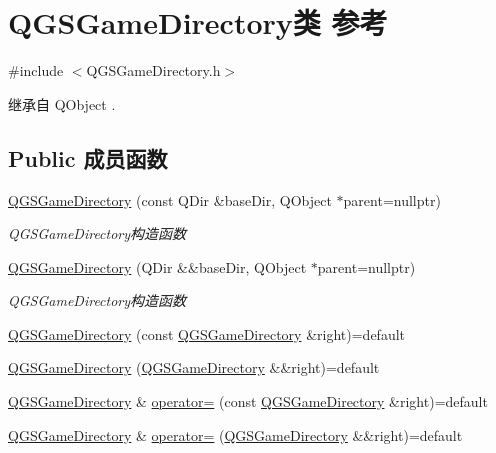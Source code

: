 \hypertarget{class_q_g_s_game_directory}{}\section{Q\+G\+S\+Game\+Directory类 参考}
\label{class_q_g_s_game_directory}


{\ttfamily \#include $<$Q\+G\+S\+Game\+Directory.\+h$>$}



继承自 Q\+Object .

\subsection*{Public 成员函数}
\begin{DoxyCompactItemize}
\item 
\mbox{\hyperlink{class_q_g_s_game_directory_a3bdb7ff5edb5e460f425cffb499fc25b}{Q\+G\+S\+Game\+Directory}} (const Q\+Dir \&base\+Dir, Q\+Object $\ast$parent=nullptr)
\begin{DoxyCompactList}\small\item\em Q\+G\+S\+Game\+Directory构造函数 \end{DoxyCompactList}\item 
\mbox{\hyperlink{class_q_g_s_game_directory_a1ce062aea1cbc90d891030e021df28dc}{Q\+G\+S\+Game\+Directory}} (Q\+Dir \&\&base\+Dir, Q\+Object $\ast$parent=nullptr)
\begin{DoxyCompactList}\small\item\em Q\+G\+S\+Game\+Directory构造函数 \end{DoxyCompactList}\item 
\mbox{\hyperlink{class_q_g_s_game_directory_ad5ccdce95330c099fce0b05c94aae5b8}{Q\+G\+S\+Game\+Directory}} (const \mbox{\hyperlink{class_q_g_s_game_directory}{Q\+G\+S\+Game\+Directory}} \&right)=default
\item 
\mbox{\hyperlink{class_q_g_s_game_directory_a4d1c6a621c2de25df717765f3e2ac4bc}{Q\+G\+S\+Game\+Directory}} (\mbox{\hyperlink{class_q_g_s_game_directory}{Q\+G\+S\+Game\+Directory}} \&\&right)=default
\item 
\mbox{\hyperlink{class_q_g_s_game_directory}{Q\+G\+S\+Game\+Directory}} \& \mbox{\hyperlink{class_q_g_s_game_directory_a92a8780e4e1a28b379c1056427a28188}{operator=}} (const \mbox{\hyperlink{class_q_g_s_game_directory}{Q\+G\+S\+Game\+Directory}} \&right)=default
\item 
\mbox{\hyperlink{class_q_g_s_game_directory}{Q\+G\+S\+Game\+Directory}} \& \mbox{\hyperlink{class_q_g_s_game_directory_a1dfa3ea4aef78249e2e13f0dda8087dc}{operator=}} (\mbox{\hyperlink{class_q_g_s_game_directory}{Q\+G\+S\+Game\+Directory}} \&\&right)=default

\end{DoxyCompactItemize}
